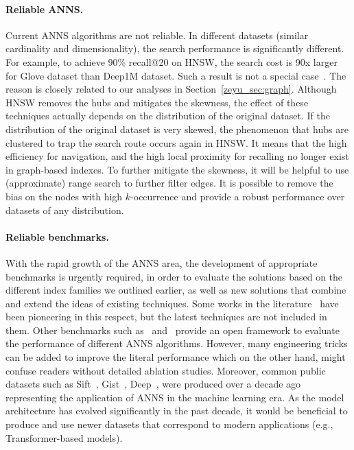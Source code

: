 \documentclass[11pt]{article}
\begin{document}
\paragraph{Reliable ANNS.}
Current ANNS algorithms are not reliable.
In different datasets (similar cardinality and dimensionality), the search performance is significantly different.
For example, to achieve 90\% recall@20 on HNSW, the search cost is 90x larger for Glove dataset than Deep1M dataset.
Such a result is not a special case~\cite{tau,adsampling,promise,note}.
The reason is closely related to our analyses in Section~\ref{zeyu_sec:graph}.
Although HNSW removes the hubs and mitigates the skewness, the effect of these techniques actually depends on the distribution of the original dataset.
If the distribution of the original dataset is very skewed, the phenomenon that hubs are clustered to trap the search route occurs again in HNSW.
It means that the high efficiency for navigation, and the high local proximity for recalling no longer exist in graph-based indexes.
To further mitigate the skewness, it will be helpful to use (approximate) range search to further filter edges.
It is possible to remove the bias on the nodes with high $k$-occurrence and provide a robust performance over datasets of any distribution.

\paragraph{Reliable benchmarks.}
With the rapid growth of the ANNS area, the development of appropriate benchmarks is urgently required, in order to evaluate the solutions based on the different index families we outlined earlier, as well as new solutions that combine and extend the ideas of existing techniques.
Some works in the literature~\cite{hydra1,hydra2,tkde-survey} have been pioneering in this respect, but the latest techniques are not included in them.
Other benchmarks such as~\cite{competition} and~\cite{ann-benchmark,lid} provide an open framework to evaluate the performance of different ANNS algorithms.
However, many engineering tricks can be added to improve the literal performance which on the other hand, might confuse readers without detailed ablation studies.
Moreover, common public datasets such as Sift~\cite{sift}, Gist~\cite{sift}, Deep~\cite{deep}, were produced over a decade ago representing the application of ANNS in the machine learning era.
As the model architecture has evolved significantly in the past decade, it would be beneficial to produce and use newer datasets that correspond to modern applications (e.g., Transformer-based models).
\end{document}
